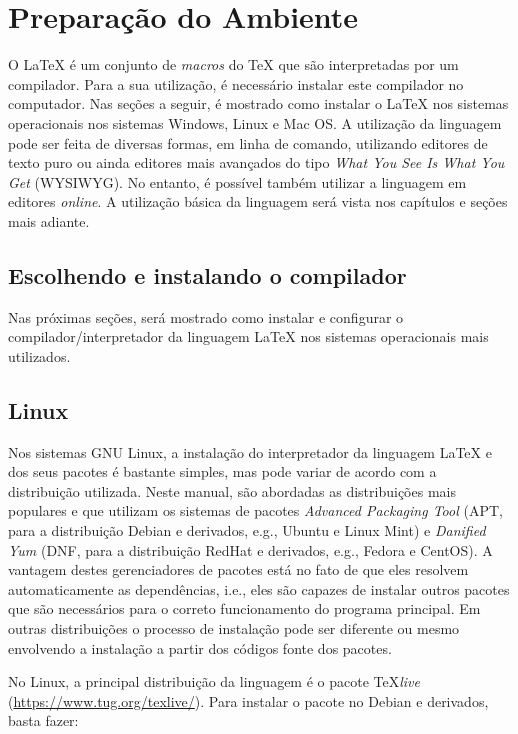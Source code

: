 \section{Preparação do Ambiente}
\label{sec:prepara}

O \LaTeX{} é um conjunto de \textit{macros} do \TeX{} que são interpretadas por um compilador. Para a sua utilização, é necessário instalar este compilador no computador. Nas seções a seguir, é mostrado como instalar o \LaTeX{} nos sistemas operacionais nos sistemas Windows, Linux e Mac OS. A utilização da linguagem pode ser feita de diversas formas, em linha de comando, utilizando editores de texto puro ou ainda editores mais avançados do tipo \textit{What You See Is What You Get} (WYSIWYG). No entanto, é possível também utilizar a linguagem em editores \textit{online}. A utilização básica da linguagem será vista nos capítulos e seções mais adiante.
 
\subsection{Escolhendo e instalando o compilador}
\label{sec:compilador}

Nas próximas seções, será mostrado como instalar e configurar o compilador/interpretador da linguagem \LaTeX{} nos sistemas operacionais mais utilizados.

\subsection*{Linux}
\label{sec:linux}

Nos sistemas GNU Linux, a instalação do interpretador da linguagem \LaTeX{} e dos seus pacotes é bastante simples, mas pode variar de acordo com a distribuição utilizada. Neste manual, são abordadas as distribuições mais populares e que utilizam os sistemas de pacotes \textit{Advanced Packaging Tool} (APT, para a distribuição Debian e derivados, e.g., Ubuntu e Linux Mint) e \textit{Danified Yum} (DNF, para a distribuição RedHat e derivados, e.g., Fedora e CentOS). A vantagem destes gerenciadores de pacotes está no fato de que eles resolvem automaticamente as dependências, i.e., eles são capazes de instalar outros pacotes que são necessários para o correto funcionamento do programa principal. Em outras distribuições o processo de instalação pode ser diferente ou mesmo envolvendo a instalação a partir dos códigos fonte dos pacotes. 

No Linux, a principal distribuição da linguagem é o pacote \TeX \textit{live} (\url{https://www.tug.org/texlive/}). Para instalar o pacote no Debian e derivados, basta fazer:

